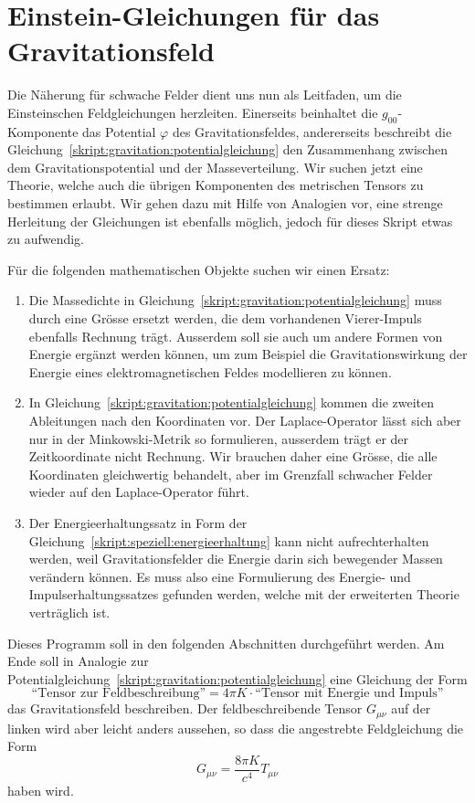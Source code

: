 \section{Einstein-Gleichungen für das Gravitationsfeld}
Die Näherung für schwache Felder dient uns nun als Leitfaden, um die
Einsteinschen Feldgleichungen herzleiten.
Einerseits beinhaltet die $g_{00}$-Komponente das Potential $\varphi$ des
Gravitationsfeldes, andererseits beschreibt die
Gleichung~\eqref{skript:gravitation:potentialgleichung}
den Zusammenhang zwischen dem Gravitationspotential und der
Masseverteilung.
Wir suchen jetzt eine Theorie, welche auch die übrigen Komponenten
des metrischen Tensors zu bestimmen erlaubt.
Wir gehen dazu mit Hilfe von Analogien vor, eine strenge Herleitung
der Gleichungen ist ebenfalls möglich, jedoch für dieses Skript etwas
zu aufwendig.


Für die folgenden mathematischen Objekte suchen wir einen Ersatz:
\begin{enumerate}
\item
Die Massedichte in 
Gleichung~\eqref{skript:gravitation:potentialgleichung}
muss durch eine Grösse ersetzt werden, die dem vorhandenen Vierer-Impuls
ebenfalls Rechnung trägt.
Ausserdem soll sie auch um andere Formen von Energie ergänzt werden 
können, um zum Beispiel die Gravitationswirkung der Energie eines
elektromagnetischen Feldes modellieren zu können.
\item
In Gleichung~\eqref{skript:gravitation:potentialgleichung}
kommen die zweiten Ableitungen nach den Koordinaten vor. 
Der Laplace-Operator lässt sich aber nur in der Minkowski-Metrik so 
formulieren, ausserdem trägt er der Zeitkoordinate nicht Rechnung.
Wir brauchen daher eine Grösse, die alle Koordinaten gleichwertig
behandelt, aber im Grenzfall schwacher Felder wieder auf den 
Laplace-Operator führt.
\item
Der Energieerhaltungssatz in Form der
Gleichung~\eqref{skript:speziell:energieerhaltung}
kann nicht aufrechterhalten werden, weil
Gravitationsfelder die Energie darin sich bewegender Massen verändern
können.
Es muss also eine Formulierung des Energie- und Impulserhaltungssatzes
gefunden werden, welche mit der erweiterten Theorie verträglich ist.
\end{enumerate}
Dieses Programm soll in den folgenden Abschnitten durchgeführt werden.
Am Ende soll in Analogie zur 
Potentialgleichung~\eqref{skript:gravitation:potentialgleichung}
eine Gleichung der Form
\[
\text{``Tensor zur Feldbeschreibung''}
=
4\pi K\cdot \text{``Tensor mit Energie und Impuls''}
\]
das Gravitationsfeld beschreiben.
Der feldbeschreibende Tensor $G_{\mu\nu}$ auf der linken wird aber leicht
anders aussehen, so dass die angestrebte Feldgleichung die Form
\[
G_{\mu\nu}
=
\frac{8\pi K}{c^4} T_{\mu\nu}
\]
haben wird.

